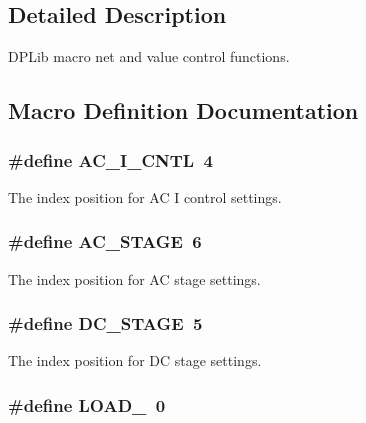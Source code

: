 \subsection{Detailed Description}
D\-P\-Lib macro net and value control functions. 

\subsection{Macro Definition Documentation}
\hypertarget{a00020_ab875424e7a295e6a0eae1605b3285adb}{
\subsubsection[{A\-C\-\_\-\-I\-\_\-\-C\-N\-T\-L}]{\setlength{\rightskip}{0pt plus 5cm}\#define A\-C\-\_\-\-I\-\_\-\-C\-N\-T\-L~4}}\label{a00020_ab875424e7a295e6a0eae1605b3285adb}
The index position for A\-C I control settings. \hypertarget{a00020_a3fc4318ae73eae35339f616047300b0f}{
\subsubsection[{A\-C\-\_\-\-S\-T\-A\-G\-E}]{\setlength{\rightskip}{0pt plus 5cm}\#define A\-C\-\_\-\-S\-T\-A\-G\-E~6}}\label{a00020_a3fc4318ae73eae35339f616047300b0f}
The index position for A\-C stage settings. \hypertarget{a00020_af3967a451ed4068ca1cbf55dd2de3799}{
\subsubsection[{D\-C\-\_\-\-S\-T\-A\-G\-E}]{\setlength{\rightskip}{0pt plus 5cm}\#define D\-C\-\_\-\-S\-T\-A\-G\-E~5}}\label{a00020_af3967a451ed4068ca1cbf55dd2de3799}
The index position for D\-C stage settings. \hypertarget{a00020_a007a209cd2e2b935be1f69218652edc1}{
\subsubsection[{L\-O\-A\-D\-\_\-0}]{\setlength{\rightskip}{0pt plus 5cm}\#define L\-O\-A\-D\-\_~0}}\label{a00020_a007a209cd2e2b935be1f69218652edc1}
